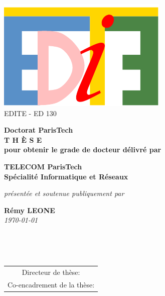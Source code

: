 \vspace{0.cm}
\begin{center}

\includegraphics[scale=0.65]{img/logos/edite.pdf} \\
{\small {EDITE - ED 130}}


\vspace{.5cm}


\vspace{1.0cm}

{\LARGE \textbf{Doctorat ParisTech}}\\
\vspace{1.1cm}
{\LARGE \textbf{T H È S E}}\\
\vspace{0.5cm}
{\normalsize \textbf{pour obtenir le grade de docteur délivré par}}\\

\vspace{.9cm}

{\LARGE \textbf{TELECOM ParisTech}}\\
\vspace{0.6cm}
{\Large \textbf{Spécialité Informatique et Réseaux}}\\

\vspace{.8cm}

{\normalsize \textit{présentée et soutenue publiquement par}}\\
\vspace{0.7cm}

{\Large \textbf{Rémy LEONE}}\\
\vspace{0.24cm}
{\normalsize \textit{\today}}\\

\vfill

\textcolor[RGB]{191,18,56}{
\noindent
{\LARGE \textbf{\myTitle}}\\
}

\vfill~\vfill

{\normalsize
\begin{tabular}{c}
Directeur de thèse: 			\textbf{\JeanLouis}\\
Co-encadrement de la thèse:		\textbf{\Vania}
\end{tabular}
}
\end{center}

